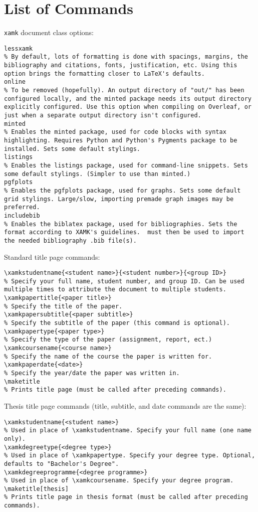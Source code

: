\section{List of Commands}

\texttt{xamk} document class options:
\begin{verbatim}
lessxamk
% By default, lots of formatting is done with spacings, margins, the bibliography and citations, fonts, justification, etc. Using this option brings the formatting closer to LaTeX's defaults.
online
% To be removed (hopefully). An output directory of "out/" has been configured locally, and the minted package needs its output directory explicitly configured. Use this option when compiling on Overleaf, or just when a separate output directory isn't configured.
minted
% Enables the minted package, used for code blocks with syntax highlighting. Requires Python and Python's Pygments package to be installed. Sets some default stylings.
listings
% Enables the listings package, used for command-line snippets. Sets some default stylings. (Simpler to use than minted.)
pgfplots
% Enables the pgfplots package, used for graphs. Sets some default grid stylings. Large/slow, importing premade graph images may be preferred.
includebib
% Enables the biblatex package, used for bibliographies. Sets the format according to XAMK's guidelines.  must then be used to import the needed bibliography .bib file(s).
\end{verbatim}
%
Standard title page commands:
\begin{verbatim}
\xamkstudentname{<student name>}{<student number>}{<group ID>}
% Specify your full name, student number, and group ID. Can be used multiple times to attribute the document to multiple students.
\xamkpapertitle{<paper title>}
% Specify the title of the paper.
\xamkpapersubtitle{<paper subtitle>}
% Specify the subtitle of the paper (this command is optional).
\xamkpapertype{<paper type>}
% Specify the type of the paper (assignment, report, ect.)
\xamkcoursename{<course name>}
% Specify the name of the course the paper is written for.
\xamkpaperdate{<date>}
% Specify the year/date the paper was written in.
\maketitle
% Prints title page (must be called after preceding commands).
\end{verbatim}
%
Thesis title page commands (title, subtitle, and date commands are the same):
\begin{verbatim}
\xamkstudentname{<student name>}
% Used in place of \xamkstudentname. Specify your full name (one name only).
\xamkdegreetype{<degree type>}
% Used in place of \xamkpapertype. Specify your degree type. Optional, defaults to "Bachelor's Degree".
\xamkdegreeprogramme{<degree programme>}
% Used in place of \xamkcoursename. Specify your degree program.
\maketitle[thesis]
% Prints title page in thesis format (must be called after preceding commands).
\end{verbatim}
